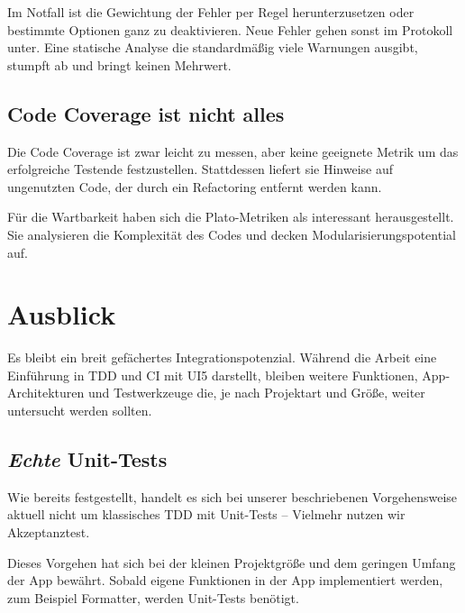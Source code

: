 Im Notfall ist die Gewichtung der Fehler per Regel herunterzusetzen oder bestimmte Optionen ganz zu deaktivieren. Neue Fehler gehen sonst im Protokoll unter. Eine statische Analyse die standardmäßig viele Warnungen ausgibt, stumpft ab und bringt keinen Mehrwert.

\subsection{Code Coverage ist nicht alles}
Die Code Coverage ist zwar leicht zu messen, aber keine geeignete Metrik um das erfolgreiche Testende festzustellen. Stattdessen liefert sie Hinweise auf ungenutzten Code, der durch ein Refactoring entfernt werden kann.

Für die Wartbarkeit haben sich die Plato-Metriken als interessant herausgestellt. Sie analysieren die Komplexität des Codes und decken Modularisierungspotential auf.


\section{Ausblick}
Es bleibt ein breit gefächertes Integrationspotenzial. Während die Arbeit eine Einführung in TDD und CI mit UI5 darstellt, bleiben weitere Funktionen, App-Architekturen und Testwerkzeuge die, je nach Projektart und Größe, weiter untersucht werden sollten.

\subsection{\emph{Echte} Unit-Tests}
Wie bereits festgestellt, handelt es sich bei unserer beschriebenen Vorgehensweise aktuell nicht um klassisches \ac{TDD} mit Unit-Tests -- Vielmehr nutzen wir Akzeptanztest.

Dieses Vorgehen hat sich bei der kleinen Projektgröße und dem geringen Umfang der App bewährt. Sobald eigene Funktionen in der App implementiert werden, zum Beispiel Formatter, werden Unit-Tests benötigt.

